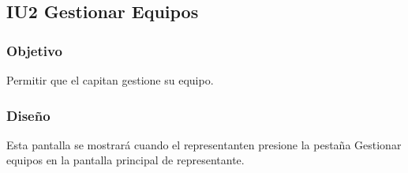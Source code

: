 
\subsection{IU2 Gestionar Equipos}

\subsubsection{Objetivo}
	Permitir que el capitan gestione su equipo.

\subsubsection{Diseño}
	Esta pantalla se mostrará cuando el representanten presione la pestaña Gestionar equipos en la pantalla principal de representante.

